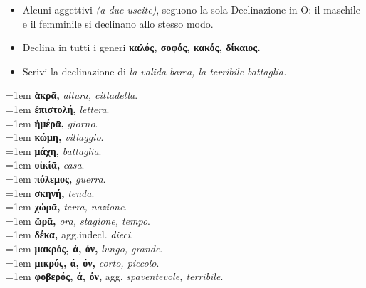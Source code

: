 \documentclass[nols]{tufte-handout}
\newcommand{\textls}[2][5]{%
    \begingroup\addfontfeatures{LetterSpace=#1}#2\endgroup
  }
\renewcommand{\smallcapsspacing}[1]{\textls[10]{#1}}
\renewcommand{\textsc}[1]{\smallcapsspacing{\textsmallcaps{#1}}}
\begin{document}
\begin{itemize}
\item[\textsc{1.}] Alcuni aggettivi \textit{(a due uscite)}, seguono la sola Declinazione in O: il maschile e il femminile si declinano allo stesso modo. 
\end{itemize}

\begin{itemize}
\item[\textsc{1.}] Declina in tutti i generi \textbf{καλός, σοφός, κακός, δίκαιος.}
\item[\textsc{2.}] Scrivi la declinazione di \textit{la valida barca, la terribile battaglia.}
\end{itemize}

\newpage


\begin{multicols}{2}
    \noindent \hangindent=1em \textbf{ἄκρᾱ,} \textit{altura, cittadella}.  \\
    \noindent \hangindent=1em \textbf{ἐπιστολή,} \textit{lettera}.  \\
    \noindent \hangindent=1em \textbf{ἡμέρᾱ,} \textit{giorno}.  \\
    \noindent \hangindent=1em \textbf{κώμη,} \textit{villaggio}.  \\
    \noindent \hangindent=1em \textbf{μάχη,} \textit{battaglia}.  \\
    \noindent \hangindent=1em \textbf{οἰκίᾱ,} \textit{casa}.  \\
    \noindent \hangindent=1em \textbf{πόλεμος,} \textit{guerra}.  \\
    \noindent \hangindent=1em \textbf{σκηνή,} \textit{tenda}.  \\
	
    \noindent \hangindent=1em \textbf{χώρᾱ,} \textit{terra, nazione}.  \\
    \noindent \hangindent=1em \textbf{ὥρᾱ,} \textit{ora, stagione, tempo}.  \\
	
	\noindent \hangindent=1em \textbf{δέκα,} agg.indecl. \textit{dieci}. \\ 
	
	
    \noindent \hangindent=1em \textbf{μακρός, ά, όν,} \textit{lungo, grande}.  \\
	\noindent \hangindent=1em \textbf{μικρός, ά, όν,} \textit{corto, piccolo}.  \\
	\noindent \hangindent=1em \textbf{φοβερός, ά, όν,} agg. \textit{spaventevole, terribile}.  \\
\end{multicols}
\end{document}
